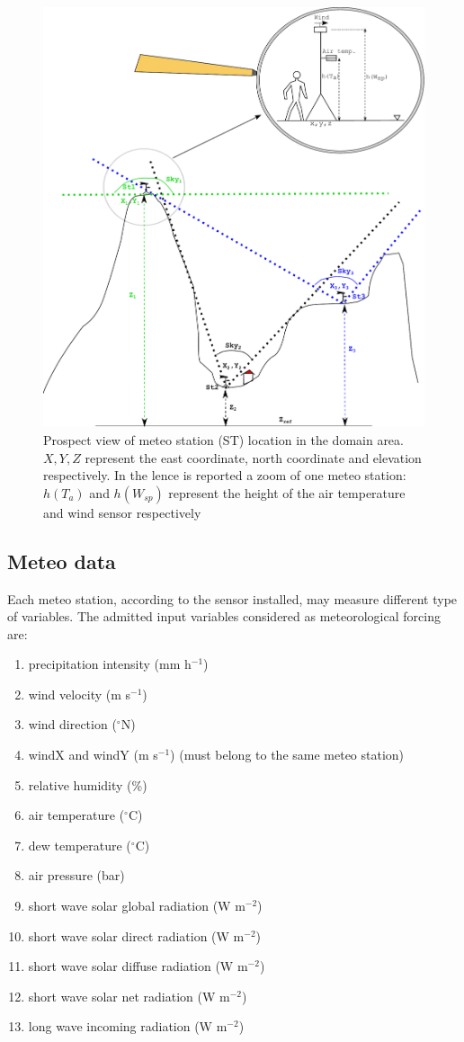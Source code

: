 \begin{figure}[t,b]
\centering
\includegraphics[width =0.85 \textwidth]{./images/pic_domain/MeteoSt.pdf}
\caption{Prospect view of meteo station (ST) location in the domain area. $X, Y, Z$ represent the east coordinate, north coordinate and elevation respectively. In the lence is reported a zoom of one meteo station: $h(T_a)$  and $h(W_{sp})$ represent the height of the air temperature and wind sensor respectively}
\label{Fig_meteoST2}
\end{figure}


\subsection{Meteo data}

Each meteo station, according to the sensor installed, may measure different type of variables. The admitted input variables considered as meteorological forcing are:

\begin{enumerate}
\item precipitation intensity (mm h$^{-1}$)
\item wind velocity (m s$^{-1}$)
\item wind direction ($^\circ$N)
\item windX and windY (m s$^{-1}$) (must belong to the same meteo station) 
\item relative humidity (\%)
\item air temperature ($^\circ$C)
\item dew temperature ($^\circ$C)
\item air pressure (bar)
\item short wave solar global radiation (W m$^{-2}$)
\item short wave solar direct radiation (W m$^{-2}$)
\item short wave solar diffuse radiation (W m$^{-2}$)
\item short wave solar net radiation (W m$^{-2}$)
\item long wave incoming radiation (W m$^{-2}$)
\end{enumerate}

